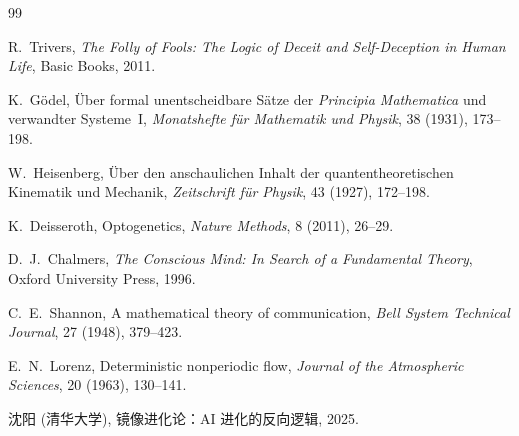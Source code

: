 \documentclass[11pt,a4paper]{article}
\begin{document}
\newpage
\begin{thebibliography}{99}

R.~Trivers,
\emph{The Folly of Fools: The Logic of Deceit and Self-Deception in Human Life},
Basic Books, 2011.

K.~G\"{o}del,
\"{U}ber formal unentscheidbare S\"{a}tze der \emph{Principia Mathematica} und verwandter Systeme~I,
\emph{Monatshefte f\"{u}r Mathematik und Physik}, 38 (1931), 173--198.

W.~Heisenberg,
\"{U}ber den anschaulichen Inhalt der quantentheoretischen Kinematik und Mechanik,
\emph{Zeitschrift f\"{u}r Physik}, 43 (1927), 172--198.

K.~Deisseroth,
Optogenetics,
\emph{Nature Methods}, 8 (2011), 26--29.

D.~J.~Chalmers,
\emph{The Conscious Mind: In Search of a Fundamental Theory},
Oxford University Press, 1996.

C.~E.~Shannon,
A mathematical theory of communication,
\emph{Bell System Technical Journal}, 27 (1948), 379--423.

E.~N.~Lorenz,
Deterministic nonperiodic flow,
\emph{Journal of the Atmospheric Sciences}, 20 (1963), 130--141.

沈阳 (清华大学),
镜像进化论：AI 进化的反向逻辑,
2025.

\end{thebibliography}
\end{document}
